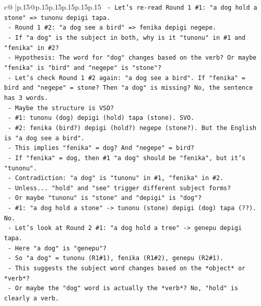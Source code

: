 \documentclass{article}
\begin{document}
{\begin{supertabular}{c@{$\;$}|p{.15\linewidth}@{}p{.15\linewidth}p{.15\linewidth}p{.15\linewidth}p{.15\linewidth}p{.15\linewidth}}
{{{\texttt{          {-} Let's re{-}read Round 1 \#1: "a dog hold a stone" => tunonu depigi tapa.} \\
\texttt{          {-} Round 1 \#2: "a dog see a bird" => fenika depigi negepe.} \\
\texttt{          {-} If "a dog" is the subject in both, why is it "tunonu" in \#1 and "fenika" in \#2?} \\
\texttt{          {-} Hypothesis: The word for "dog" changes based on the verb? Or maybe "fenika" is "bird" and "negepe" is "stone"?} \\
\texttt{          {-} Let's check Round 1 \#2 again: "a dog see a bird". If "fenika" = bird and "negepe" = stone? Then "a dog" is missing? No, the sentence has 3 words.} \\
\texttt{          {-} Maybe the structure is VSO?} \\
\texttt{            {-} \#1: tunonu (dog) depigi (hold) tapa (stone). SVO.} \\
\texttt{            {-} \#2: fenika (bird?) depigi (hold?) negepe (stone?). But the English is "a dog see a bird".} \\
\texttt{            {-} This implies "fenika" = dog? And "negepe" = bird?} \\
\texttt{            {-} If "fenika" = dog, then \#1 "a dog" should be "fenika", but it's "tunonu".} \\
\texttt{            {-} Contradiction: "a dog" is "tunonu" in \#1, "fenika" in \#2.} \\
\texttt{            {-} Unless... "hold" and "see" trigger different subject forms?} \\
\texttt{            {-} Or maybe "tunonu" is "stone" and "depigi" is "dog"?} \\
\texttt{              {-} \#1: "a dog hold a stone" {-}> tunonu (stone) depigi (dog) tapa (??). No.} \\
\texttt{            {-} Let's look at Round 2 \#1: "a dog hold a tree" {-}> genepu depigi tapa.} \\
\texttt{              {-} Here "a dog" is "genepu"?} \\
\texttt{              {-} So "a dog" = tunonu (R1\#1), fenika (R1\#2), genepu (R2\#1).} \\
\texttt{              {-} This suggests the subject word changes based on the *object* or *verb*?} \\
\texttt{              {-} Or maybe the "dog" word is actually the *verb*? No, "hold" is clearly a verb.} \\
}}}
\end{supertabular}}
\end{document}
